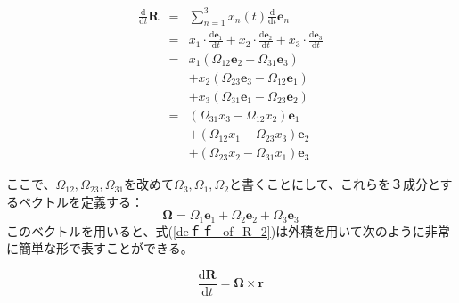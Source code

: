 \documentclass[twocolumn,a4j,10pt]{jarticle}
\begin{document}
\begin{eqnarray}
  \frac{\mathrm{d}}{\mathrm{d} t} \bm{R} &=& \sum_{n=1}^{3}x_n (t) \frac{\mathrm{d}}{\mathrm{d} t} \bm{e}_n \nonumber \\
  &=& x_1 \cdot \frac{\mathrm{d}\bm{e}_1}{\mathrm{d} t}
+ x_2 \cdot \frac{\mathrm{d}\bm{e}_2}{\mathrm{d} t}
+ x_3 \cdot \frac{\mathrm{d}\bm{e}_3}{\mathrm{d} t} \nonumber \\
  &=& x_1 \left( \Omega_{12} \bm{e}_2 - \Omega_{31} \bm{e}_3 \right) \nonumber \\
  & & + x_2 \left( \Omega_{23} \bm{e}_3 - \Omega_{12} \bm{e}_1 \right) \nonumber \\
  & & + x_3 \left( \Omega_{31} \bm{e}_1 - \Omega_{23} \bm{e}_2 \right) \nonumber \\
  &=& (\Omega_{31} x_3 - \Omega_{12} x_2) \bm{e}_1 \nonumber \\
  & & + (\Omega_{12} x_1 - \Omega_{23} x_3) \bm{e}_2 \nonumber \\
  & & + (\Omega_{23} x_2 - \Omega_{31} x_1) \bm{e}_3
  \label{deｆｆ_of_R_2}
\end{eqnarray}

ここで、$\Omega_{12},\Omega_{23},\Omega_{31}$を改めて$\Omega_{3},\Omega_{1},\Omega_{2}$と書くことにして、これらを３成分とするベクトルを定義する：
\begin{equation}
  \bm{\Omega} = \Omega_1 \bm{e}_1 + \Omega_2 \bm{e}_2 + \Omega_3 \bm{e}_3
  \label{angular_speed}
\end{equation}
このベクトルを用いると、式(\ref{deｆｆ_of_R_2})は外積を用いて次のように非常に簡単な形で表すことができる。

\begin{equation}
  \frac{\mathrm{d} \bm{R}}{\mathrm{d} t} = \bm{\Omega} \times \bm{r}
  \label{angular_speed}
\end{equation}
\end{document}
